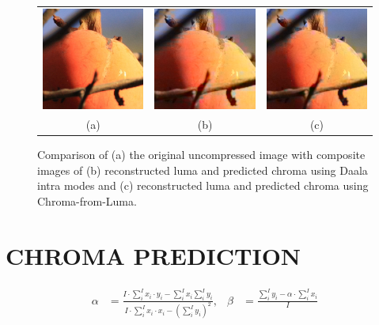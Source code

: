 \documentclass[a4paper]{spie}  %
\begin{document}
\begin{figure}
\begin{center}
\begin{tabular}{c c c}
\includegraphics[natwidth=200,natheight=200,width=1.75in]{fruits-orig.png}
&
\includegraphics[natwidth=200,natheight=200,width=1.75in]{fruits-intra.png}
&
\includegraphics[natwidth=200,natheight=200,width=1.75in]{fruits-cfl.png}
\\
(a) & (b) & (c)
\end{tabular}
\end{center}
\caption[example]{\label{fig:comp} Comparison of (a) the original uncompressed
 image with composite images of (b) reconstructed luma and predicted chroma
 using Daala intra modes and (c) reconstructed luma and predicted chroma using
 Chroma-from-Luma.}
\end{figure}

\section{CHROMA PREDICTION}
\label{sec:chroma}



\begin{align*}
\alpha & = \frac{I\cdot\displaystyle\sum_i^I x_i\cdot y_i - \displaystyle\sum_i^I x_i\displaystyle\sum_i^I y_i}{I\cdot\displaystyle\sum_i^I x_i\cdot x_i - \left(\displaystyle\sum_i^I y_i\right)^2}, & \beta & = \frac{\displaystyle\sum_i^I y_i -\alpha\cdot\displaystyle\sum_i^I x_i}{I}
\end{align*}
\end{document}
